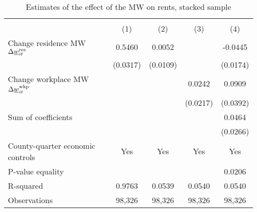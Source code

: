 \begin{table}[hbt!] \centering
    \caption{Estimates of the effect of the MW on rents, stacked sample}
    \label{tab:stacked_w6}
    \begin{tabular}{l*{4}{c}}
        \toprule
        & 
            &  \\ \cmidrule(lr){2-2}\cmidrule(lr){3-5}
                                            & (1)   & (2)   & (3)   & (4)            \\ \midrule
        Change residence MW 
                    $\Delta\underline{w}_{it}^{\text{res}}$  &  0.5460  &  0.0052  &       &  -0.0445     \\
                                            & (0.0317) & (0.0109) &       & (0.0174)    \\
        Change workplace MW 
                    $\Delta\underline{w}_{it}^{\text{wkp}}$ &       &       &  0.0242  & 0.0909      \\
                                            &       &       & (0.0217) & (0.0392)    \\ \midrule
        Sum of coefficients                &       &       &       &  0.0464     \\
                                            &       &       &       & (0.0266)    \\ \midrule
        County-quarter economic controls   &  Yes  & Yes   & Yes   & Yes      \\
        P-value equality                   &       &       &       & 0.0206      \\
        R-squared                          &  0.9763  &  0.0539  &  0.0540  & 0.0540      \\
        Observations                       & 98,326  & 98,326  & 98,326  & 98,326     \\\bottomrule
    \end{tabular}


\end{table}
